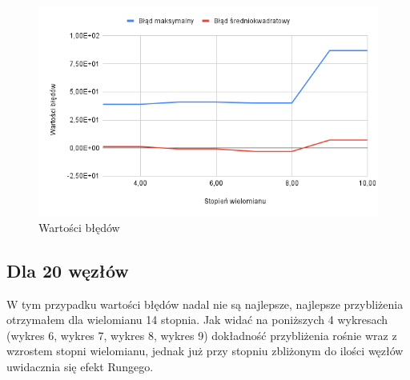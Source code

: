 \documentclass{article}
\begin{document}
\begin{figure}[H]
  \centering
  \begin{minipage}[b]{0.4\textwidth}
    \includegraphics[width=\textwidth]{img14.png}
    \caption{Wartości błędów}
  \end{minipage}
\end{figure}

\newpage

\subsection{Dla 20 węzłów}

W tym przypadku wartości błędów nadal nie są najlepsze, najlepsze przybliżenia otrzymałem dla wielomianu 14 stopnia. Jak widać na poniższych 4 wykresach (wykres 6, wykres 7, wykres 8, wykres 9) dokładność przybliżenia rośnie wraz z wzrostem stopni wielomianu, jednak już przy stopniu zbliżonym do ilości węzłów uwidacznia się efekt Rungego.
\end{document}
